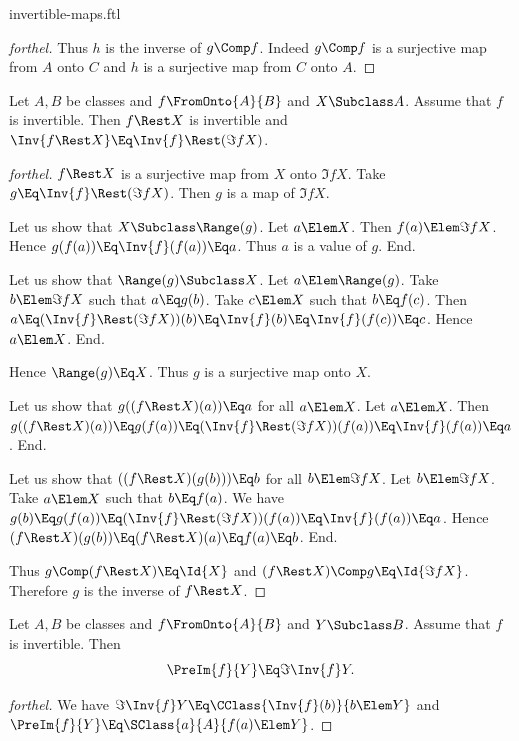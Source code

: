 \documentclass{stex}
\begin{document}
\begin{smodule}{invertible-maps.ftl}
\begin{proof}[forthel]
  Thus $h$ is the inverse of $g \Comp f$.
  Indeed $g \Comp f$ is a surjective map from $A$ onto $C$ and $h$ is a surjective map from $C$ onto $A$.
\end{proof}

\begin{proposition*}[forthel]
  Let $A, B$ be classes and $f \FromOnto{A}{B}$ and $X \Subclass A$.
  Assume that $f$ is invertible.
  Then $f \Rest X$ is invertible and $\Inv{f\Rest X} \Eq \Inv{f} \Rest (\Im{f}{X})$.
\end{proposition*}
\begin{proof}[forthel]
  $f \Rest X$ is a surjective map from $X$ onto $\Im{f}{X}$.
  Take $g \Eq \Inv{f} \Rest (\Im{f}{X})$.
  Then $g$ is a map of $\Im{f}{X}$.

  Let us show that $X \Subclass \Range(g)$.
    Let $a \Elem X$.
    Then $f(a) \Elem \Im{f}{X}$.
    Hence $g(f(a)) \Eq \Inv{f}(f(a)) \Eq a$.
    Thus $a$ is a value of $g$.
  End.

  Let us show that $\Range(g) \Subclass X$.
    Let $a \Elem \Range(g)$.
    Take $b \Elem \Im{f}{X}$ such that $a \Eq g(b)$.
    Take $c \Elem X$ such that $b \Eq f(c)$.
    Then $a
      \Eq (\Inv{f} \Rest (\Im{f}{X}))(b)
      \Eq \Inv{f}(b)
      \Eq \Inv{f}(f(c))
      \Eq c$.
    Hence $a \Elem X$.
  End.

  Hence $\Range(g) \Eq X$.
  Thus $g$ is a surjective map onto $X$.

  Let us show that $g((f \Rest X)(a)) \Eq a$ for all $a \Elem X$.
    Let $a \Elem X$.
    Then $g((f \Rest X)(a))
      \Eq g(f(a))
      \Eq (\Inv{f} \Rest (\Im{f}{X}))(f(a))
      \Eq \Inv{f}(f(a))
      \Eq a$.
  End.

  Let us show that $((f \Rest X)(g(b))) \Eq b$ for all $b \Elem \Im{f}{X}$.
    Let $b \Elem \Im{f}{X}$.
    Take $a \Elem X$ such that $b \Eq f(a)$.
    We have $g(b)
      \Eq g(f(a))
      \Eq (\Inv{f} \Rest (\Im{f}{X}))(f(a))
      \Eq \Inv{f}(f(a))
      \Eq a$.
    Hence $(f \Rest X)(g(b))
      \Eq (f \Rest X)(a)
      \Eq f(a)
      \Eq b$.
  End.

  Thus $g \Comp (f \Rest X) \Eq \Id{X}$ and $(f \Rest X) \Comp g \Eq \Id{\Im{f}{X}}$.
  Therefore $g$ is the inverse of $f \Rest X$.
\end{proof}

\begin{proposition*}[forthel]
  Let $A, B$ be classes and $f \FromOnto{A}{B}$ and $Y \Subclass B$.
  Assume that $f$ is invertible.
  Then \[ \PreIm{f}{Y} \Eq \Im{\Inv{f}}{Y}. \]
\end{proposition*}
\begin{proof}[forthel]
  We have $\Im{\Inv{f}}{Y} \Eq \CClass{\Inv{f}(b)}{b \Elem Y}$ and $\PreIm{f}{Y} \Eq \SClass{a}{A}{f(a) \Elem Y}$.


\end{proof}
\end{smodule}
\end{document}
